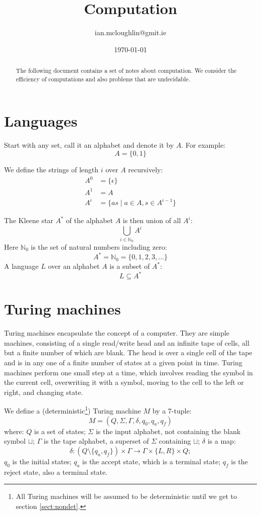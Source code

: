 

\title{Computation}
\author{ian.mcloughlin@gmit.ie}
\date{\today}



\maketitle

\begin{abstract}
  The following document contains a set of notes about computation.
  We consider the efficiency of computations and also problems that are undecidable.
\end{abstract}

\section{Languages}
  Start with any set, call it an alphabet and denote it by \( A \).
  For example:
  \[ A = \{ 0, 1 \} \]

  We define the strings of length \( i \) over \( A \) recursively:
  \begin{align*}
    A^0 &= \{ \epsilon \} \\
    A^1 &= A \\
    A^{i} &= \{ as \mid a \in A, s \in A^{i-1} \}
  \end{align*}

  The Kleene star \( A^* \) of the alphabet \( A \) is then union of all \( A^i \):
  \[ \bigcup_{i \in \mathbb{N}_0} A^i\]
  Here \( \mathbb{N}_0 \) is the set of natural numbers including zero:
  \[ A^* = \mathbb{N}_0 = \{ 0, 1, 2, 3, \ldots \} \]
  A language \( L \) over an alphabet \( A \) is a subset of \( A^* \):
  \[ L \subseteq A^* \]

\section{Turing machines}
  Turing machines encapsulate the concept of a computer.
  They are simple machines, consisting of a single read/write head and an infinite tape of cells, all but a finite number of which are blank.  
  The head is over a single cell of the tape and is in any one of a finite number of states at a given point in time.
  Turing machines perform one small step at a time, which involves reading the symbol in the current cell, overwriting it with a symbol, moving to the cell to the left or right, and changing state.

  We define a (deterministic\footnote{All Turing machines will be assumed to be deterministic until we get to section \ref{sect:nondet}.}) Turing machine \( M \) by a 7-tuple:
  \[ M = ( Q, \Sigma, \Gamma, \delta, q_0, q_a, q_f ) \]
  where:
  \( Q \) is a set of states;
  \( \Sigma \) is the input alphabet, not containing the blank symbol \( \sqcup \);
  \( \Gamma \) is the tape alphabet, a superset of \( \Sigma \) containing \( \sqcup \);
  \( \delta \) is a map:
  \[ \delta: (Q \setminus \{ q_a, q_f \}) \times \Gamma \rightarrow \Gamma \times \{ L, R \} \times Q; \]
  \( q_0 \) is the initial states;
  \( q_a \) is the accept state, which is a terminal state;
  \( q_f \) is the reject state, also a terminal state.  
  
